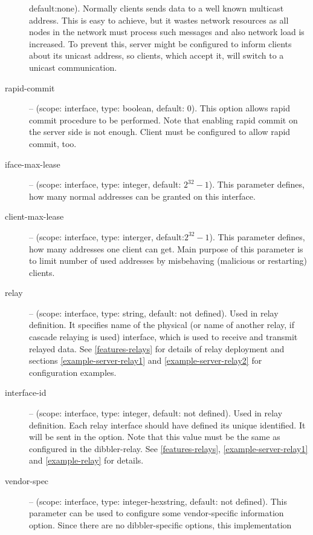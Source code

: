 \begin{description}
	    default:none). Normally clients sends data to a well known
	    multicast address. This is easy to achieve, but it wastes
	    network resources as all nodes in the network must process
	    such messages and also network load is increased. To prevent
	    this, server might be configured to inform clients about its
	    unicast address, so clients, which accept it, will switch to
	    a unicast communication.
 \item[rapid-commit] -- (scope: interface, type: boolean, default:
            0). This option allows rapid commit procedure to be
            performed. Note that enabling rapid commit on the server
            side is not enough. Client must be configured to allow
	    rapid commit, too.
\item[iface-max-lease] -- (scope: interface, type: integer, default:
            $2^{32}-1$). This parameter defines, how many normal
            addresses can be granted on this interface.
\item[client-max-lease] -- (scope: interface, type: interger,
            default:$2^{32}-1$). This parameter defines, how many
            addresses one client can get. Main purpose of this
            parameter is to limit number of used addresses by
            misbehaving (malicious or restarting) clients.
\item[relay] -- (scope: interface, type: string, default: not
            defined). Used in relay definition.
            It specifies name of the physical (or name of
            another relay, if cascade relaying is used) interface,
            which is used to receive and transmit relayed data. See
            \ref{features-relays} for details of relay deployment and
            sections \ref{example-server-relay1} and
            \ref{example-server-relay2} for configuration examples. 
\item[interface-id] -- (scope: interface, type: integer, default: not
            defined). Used in relay definition. Each relay interface
            should have defined its unique identified. It will be sent
            in the  option. Note that this value
            must be the same as configured in the dibbler-relay. See
            \ref{features-relays}, \ref{example-server-relay1} and
            \ref{example-relay} for details.
 \item[vendor-spec] -- (scope: interface, type: integer-hexstring,
	    default: not defined). This parameter can be used to
	    configure some vendor-specific information option. Since
	    there are no dibbler-specific options, this implementation

\end{description}
